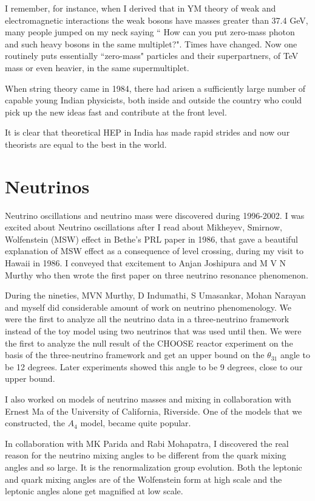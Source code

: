 I remember, for instance, when I derived that in YM theory of weak and 
electromagnetic interactions the weak bosons have masses greater than 
37.4 GeV, many people jumped on my neck saying `` How can you put 
zero-mass photon and such heavy bosons in the same multiplet?". Times 
have changed. Now one routinely puts essentially ``zero-mass" particles 
and their superpartners, of TeV mass or even heavier, in the same 
supermultiplet.

When string theory came in 1984, there had arisen a sufficiently large 
number of capable young Indian physicists, both inside and outside the 
country who could pick up the new ideas fast and contribute at the front 
level.

It is clear that theoretical HEP in India has made rapid strides and now 
our theorists are equal to the best in the world.

\section*{Neutrinos}

Neutrino oscillations and neutrino mass were discovered during 
1996-2002. I was excited about Neutrino oscillations after I read about 
Mikheyev, Smirnow, Wolfenstein (MSW) effect in Bethe's PRL paper in 1986, 
that gave a beautiful explanation of MSW effect as a consequence of 
level crossing, during my visit to Hawaii in 1986. I conveyed that 
excitement to Anjan Joshipura and M V N Murthy who then wrote the first 
paper on three neutrino resonance phenomenon.

During the nineties,  MVN Murthy, D Indumathi, S Umasankar, 
Mohan Narayan and myself did considerable amount of work on neutrino 
phenomenology. We were the first to analyze all the neutrino data in a 
three-neutrino framework instead of the toy model using two neutrinos 
that was used until then. We were the first to analyze the null result 
of the CHOOSE reactor experiment on the basis of the three-neutrino 
framework and get an upper bound on the $\theta_{31}$ angle to be 12 degrees. 
Later experiments showed this angle to be 9 degrees, close to our upper 
bound.

I also worked on models of neutrino masses and mixing in collaboration 
with Ernest Ma of the University of California, Riverside. One of the 
models that we constructed, the $A_4$ model, became quite popular.

In collaboration with MK Parida and Rabi Mohapatra, I discovered the 
real reason for the neutrino mixing angles to be different from the 
quark mixing angles and so large. It is the renormalization group 
evolution. Both the leptonic and quark mixing angles are of the 
Wolfenstein form at high scale and the leptonic angles alone get 
magnified at low scale.
 
